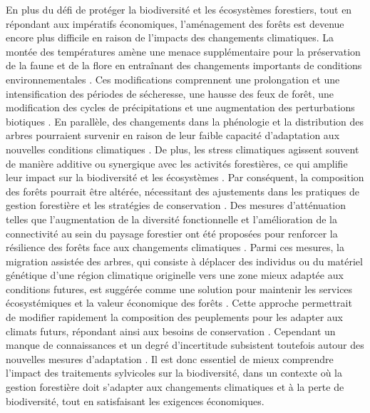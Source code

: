 En plus du défi de protéger la biodiversité et les écosystèmes forestiers, tout en répondant aux impératifs économiques, l'aménagement des forêts est devenue encore plus difficile en raison de l'impacts des changements climatiques. 
La montée des températures amène une menace supplémentaire pour la préservation de la faune et de la flore en entraînant des changements importants de conditions environnementales \citep{McKenney2009Climatechange,Trumbore2015Foresthealth,Seidl2017Forestdisturbances,Messier2022Warningnatural}. 
Ces modifications comprennent une prolongation et une intensification des périodes de sécheresse, une hausse des feux de forêt, une modification des cycles de précipitations et une augmentation des perturbations biotiques \citep{Parmesan2007Influencesspecies,Joyce2013Climatechange,Gatti2021Amazoniacarbon,Heidari2021Effectsclimate}. 
En parallèle, des changements dans la phénologie et la distribution des arbres pourraient survenir en raison de leur faible capacité d'adaptation aux nouvelles conditions climatiques \citep{Aitken2008Adaptationmigration,Chuine2010Whydoes,Zhu2012Failuremigrate,Gray2013Trackingsuitable}. 
De plus, les stress climatiques agissent souvent de manière additive ou synergique avec les activités forestières, ce qui amplifie leur impact sur la biodiversité et les écosystèmes \citep{Brook2008Synergiesextinction,Tremblay2018Harvestinginteracts,Ochs2022Responseterrestrial,Bouderbala2023Longtermeffect}. 
Par conséquent, la composition des forêts pourrait être altérée, nécessitant des ajustements dans les pratiques de gestion forestière et les stratégies de conservation \citep{McKenney2009Climatechange,Chmura2011Forestresponses,Lo2011Linkingclimate}. 
Des mesures d'atténuation telles que l'augmentation de la diversité fonctionnelle et l'amélioration de la connectivité au sein du paysage forestier ont été proposées pour renforcer la résilience des forêts face aux changements climatiques \citep{Messier2019functionalcomplex}. 
Parmi ces mesures, la migration assistée des arbres, qui consiste à déplacer des individus ou du matériel génétique d'une région climatique originelle vers une zone mieux adaptée aux conditions futures, 
est suggérée comme une solution pour maintenir les services écosystémiques et la valeur économique des forêts \citep{Vitt2010Assistedmigration,Pedlar2011implementationassisted,Ste-Marie2011Assistedmigration,Winder2011Ecologicalimplications}. 
Cette approche permettrait de modifier rapidement la composition des peuplements pour les adapter aux climats futurs, répondant ainsi aux besoins de conservation \citep{Dumroese2015Considerationsrestoring,Park2018Informationunderload,Park2023Provenancetrials}. 
Cependant un manque de connaissances et un degré d'incertitude subsistent toutefois autour des nouvelles mesures d'adaptation \citep{Klenk2015assistedmigration,Park2018Informationunderload}. 
Il est donc essentiel de mieux comprendre l'impact des traitements sylvicoles sur la biodiversité, dans un contexte où la gestion forestière doit s'adapter aux changements climatiques et à la perte de biodiversité, tout en satisfaisant les exigences économiques. 


